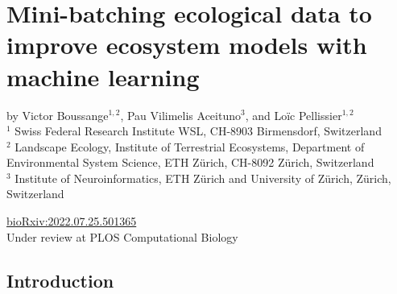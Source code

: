 \newcommand{\perr}{|\nicefrac{(\hat p -\Tilde{p})}{\Tilde{p}}|}
\newcommand{\by}{\textbf{y}}
\newcommand{\AIC}{\text{AIC}}
\newcommand{\M}{\mathcal{M}}

\graphicspath{{./content/part_II/mini-batching/}}

%
\chapter{Mini-batching ecological data to improve ecosystem models with machine learning}
\label{chap:mini-batching}

by Victor Boussange$^{1,2}$, 
Pau Vilimelis Aceituno$^{3}$, 
and 
Loïc Pellissier$^{1,2}$\bigskip\\

$^1$ \small{Swiss Federal Research Institute WSL, CH-8903 Birmensdorf, Switzerland}\smallskip\\
$^2$ \small{Landscape Ecology, Institute of Terrestrial Ecosystems, Department of Environmental System Science, ETH Zürich, CH-8092 Zürich, Switzerland}\smallskip\\
$^3$ \small{Institute of Neuroinformatics, ETH Zürich and University of Zürich, Zürich, Switzerland}\smallskip

\begin{center}
    \href{https://www.biorxiv.org/content/10.1101/2022.07.25.501365v1}{bioRxiv:2022.07.25.501365}\\
    Under review at PLOS Computational Biology
\end{center}


\section{Introduction}

